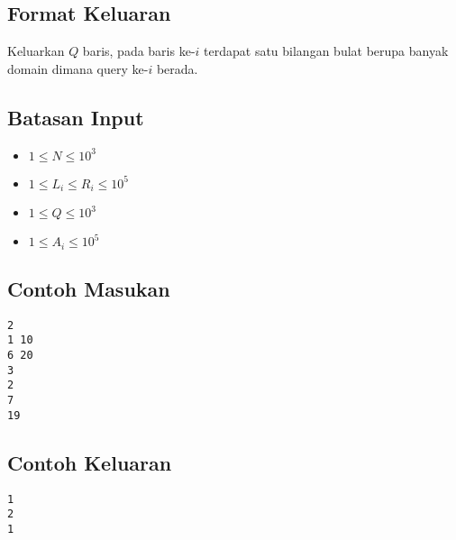 \documentclass{article}
\begin{document}
\subsection*{Format Keluaran}
Keluarkan $Q$ baris, pada baris ke-$i$ terdapat satu bilangan bulat berupa banyak domain dimana query ke-$i$ berada.

\subsection*{Batasan Input}

\begin{itemize}
    \item{$1 \leq N \leq 10^3$}
    \item{$1 \leq L_i \leq R_i \leq 10^5$}
    \item{$1 \leq Q \leq 10^3$}
    \item{$1 \leq A_i \leq 10^5$}
\end{itemize}

\begin{multicols}{2}
\subsection*{Contoh Masukan}
\begin{lstlisting}
2
1 10
6 20
3
2
7
19
\end{lstlisting}
\columnbreak
\subsection*{Contoh Keluaran}
\begin{lstlisting}
1
2
1
\end{lstlisting}
\vfill
\null
\end{multicols}
\end{document}
